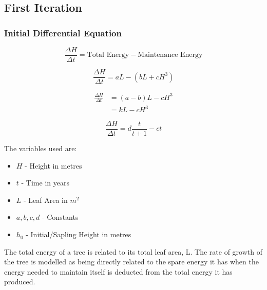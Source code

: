 \documentclass[twocolumn]{article} %
\begin{document}
\subsection{First Iteration}
\subsubsection{Initial Differential Equation}


\begin{equation}
\label{eq:one}
    \frac{\Delta H}{\Delta t} = \text{Total Energy} - \text{Maintenance Energy}
\end{equation}

\begin{equation}
\label{eq:two}
    \frac{\Delta H}{\Delta t} = aL - (bL+cH^3)
\end{equation}

\begin{equation}
\label{eq:three}
\begin{split}
    \frac{\Delta H}{\Delta t} & = (a-b)L - cH^3 \\
    & = kL - cH^3
\end{split}
\end{equation}

\begin{equation}
\label{eq:four}
    \frac{\Delta H}{\Delta t} = d \frac{t}{t+1} - ct
\end{equation}



The variables used are:
\begin{itemize}
\item $H$ - Height in metres
\item $t$ - Time in years
\item $L$ - Leaf Area in $m^2$
\item $a, b, c, d$ - Constants
\item $h_0$ - Initial/Sapling Height in metres
\end{itemize}

The total energy of a tree is related to its total leaf area, L. The rate of growth of the tree is modelled as being directly related to the spare energy it has when the energy needed to maintain itself is deducted from the total energy it has produced. 
\end{document}
